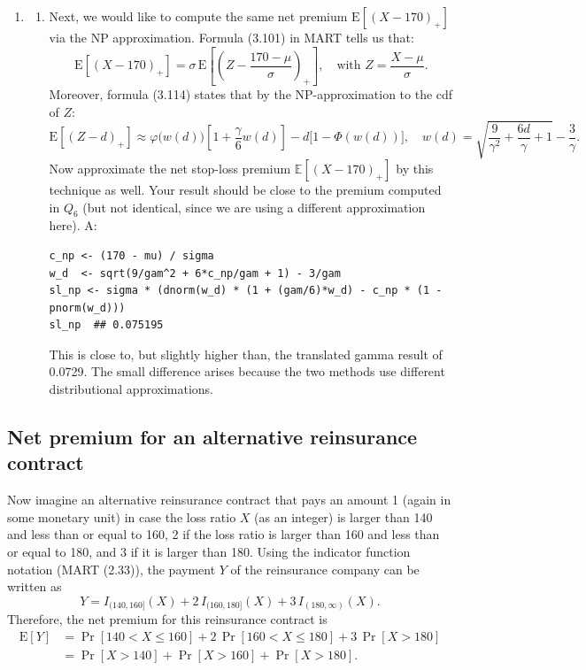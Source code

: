 \documentclass{article}
\begin{document}
\newpage
\begin{enumerate}
  \item[$\boldsymbol{Q_7}$]
    \begin{enumerate}
      \item[] Next, we would like to compute the same net premium $\mathrm{E}[(X-170)_+]$ via the NP approximation. Formula (3.101) in MART tells us that:
      \[
        \mathrm{E}[(X-170)_+] = \sigma\,\mathrm{E}\!\left[\left(Z - \frac{170-\mu}{\sigma}\right)_+\right], \quad \text{with } Z = \frac{X-\mu}{\sigma}.
      \]
      Moreover, formula (3.114) states that by the NP-approximation to the cdf of $Z$:
      \[
        \mathrm{E}[(Z-d)_+] \approx \varphi\!\bigl(w(d)\bigr)\!\left[1 + \frac{\gamma}{6}w(d)\right] - d\bigl[1-\Phi(w(d))\bigr],
        \quad w(d) = \sqrt{\frac{9}{\gamma^2} + \frac{6d}{\gamma} + 1} - \frac{3}{\gamma}.
      \]
      Now approximate the net stop-loss premium $\mathbb{E}[(X-170)_{+}]$ by this technique as well. Your result should be close to the premium computed in $Q_6$ (but not identical, since we are using a diﬀerent approximation here). A:

\begin{lstlisting}
c_np <- (170 - mu) / sigma
w_d  <- sqrt(9/gam^2 + 6*c_np/gam + 1) - 3/gam
sl_np <- sigma * (dnorm(w_d) * (1 + (gam/6)*w_d) - c_np * (1 - pnorm(w_d)))
sl_np  ## 0.075195
\end{lstlisting}

      This is close to, but slightly higher than, the translated gamma result of 0.0729. The small difference arises because the two methods use different distributional approximations.
    \end{enumerate}
\end{enumerate}

\newpage
\subsection*{Net premium for an alternative reinsurance contract}
Now imagine an alternative reinsurance contract that pays an amount 1 (again in some monetary unit) in case the loss ratio $X$ (as an integer) is larger than 140 and less than or equal to 160, 2 if the loss ratio is larger than 160 and less than or equal to 180, and 3 if it is larger than 180. Using the indicator function notation (MART (2.33)), the payment $Y$ of the reinsurance company can be written as
\[
  Y = I_{(140,160]}(X) + 2\,I_{(160,180]}(X) + 3\,I_{(180,\infty)}(X).
\]
Therefore, the net premium for this reinsurance contract is
\begin{align*}
  \mathrm{E}[Y] &= \Pr[140 < X \leq 160] + 2\,\Pr[160 < X \leq 180] + 3\,\Pr[X > 180]\\
                &= \Pr[X > 140] + \Pr[X > 160] + \Pr[X > 180].
\end{align*}
\end{document}

